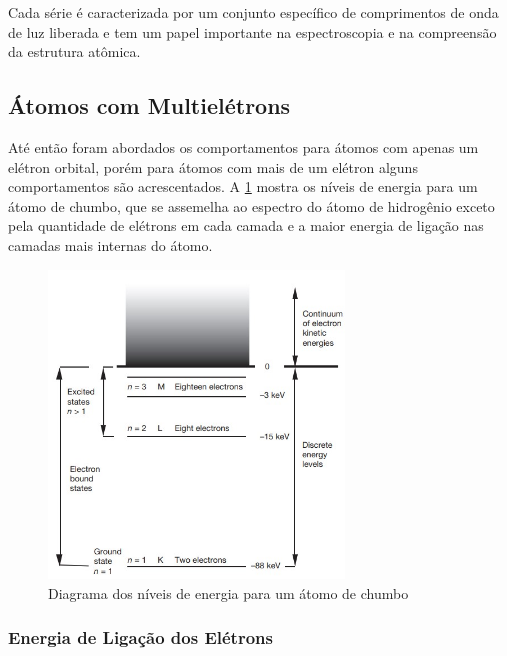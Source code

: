 \documentclass[11pt,a4paper]{article}
\begin{document}
                Cada série é caracterizada por um conjunto específico de comprimentos de onda de luz liberada e tem um papel importante na espectroscopia e na compreensão da estrutura atômica.

            

        \subsection{Átomos com Multielétrons}
            
            Até então foram abordados os comportamentos para átomos com apenas um elétron orbital, porém para átomos com mais de um elétron alguns comportamentos são acrescentados. A \ref{fig:diagramaNiveisDeEnergiaParaAtomosMultieletrons} mostra os níveis de energia para um átomo de chumbo, que se assemelha ao espectro do átomo de hidrogênio exceto pela quantidade de elétrons em cada camada e a maior energia de ligação nas camadas mais internas do átomo.

                \begin{figure}[h]
                    \centering
                    \includegraphics[width=0.7\textwidth]{Imagens/diagramaNiveisDeEnergiaParaAtomosMultieletrons.jpg}
                    \caption{Diagrama dos níveis de energia para um átomo de chumbo}
                    \label{fig:diagramaNiveisDeEnergiaParaAtomosMultieletrons}
                \end{figure}

            \subsubsection{Energia de Ligação dos Elétrons}
\end{document}

